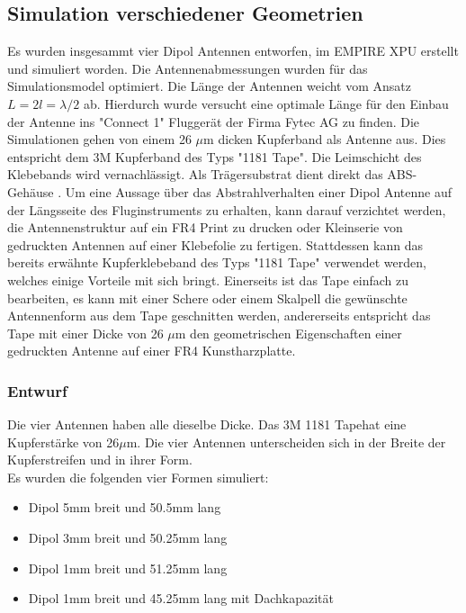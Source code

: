 \subsection{Simulation  verschiedener Geometrien}\label{sec:Sim_verschiedene_Geometrien}
Es wurden insgesammt vier Dipol Antennen entworfen, im EMPIRE XPU erstellt und simuliert worden. Die Antennenabmessungen wurden für das Simulationsmodel optimiert. Die Länge der Antennen weicht vom Ansatz $L=2l=\lambda/2$ ab. Hierdurch wurde versucht eine optimale Länge für den Einbau der Antenne ins "Connect 1" Fluggerät der Firma Fytec AG zu finden. Die Simulationen gehen von einem 26 $\mu$m dicken Kupferband als Antenne aus. Dies entspricht dem 3M Kupferband des Typs "1181 Tape". Die Leimschicht des Klebebands wird vernachlässigt. Als Trägersubstrat dient direkt das ABS-Gehäuse \cite{Kupferband}. 
Um eine Aussage über das Abstrahlverhalten einer Dipol Antenne auf der Längsseite des Fluginstruments zu erhalten, kann darauf verzichtet werden, die Antennenstruktur auf ein FR4 Print zu drucken oder Kleinserie von gedruckten Antennen auf einer Klebefolie zu fertigen. Stattdessen kann das bereits erwähnte Kupferklebeband des Typs "1181 Tape" verwendet werden, welches einige Vorteile mit sich bringt.
Einerseits ist das Tape einfach zu bearbeiten, es kann mit einer Schere oder einem Skalpell die gewünschte Antennenform aus dem Tape geschnitten werden, andererseits entspricht das Tape mit einer Dicke von 26 $\mu$m  den geometrischen Eigenschaften einer gedruckten Antenne auf einer FR4 Kunstharzplatte.

\newpage
\subsubsection*{Entwurf}
Die vier Antennen haben alle dieselbe Dicke. Das \glqq 3M 1181 Tape\grqq hat eine Kupferstärke von 26$\mu$m. Die vier Antennen unterscheiden sich in der Breite der Kupferstreifen und in ihrer Form.\\
Es wurden die folgenden vier Formen simuliert:

\begin{itemize}
\item Dipol 5mm breit und 50.5mm lang
\item Dipol 3mm breit und 50.25mm lang
\item Dipol 1mm breit und 51.25mm lang
\item Dipol 1mm breit und 45.25mm lang mit Dachkapazität
\end{itemize}

